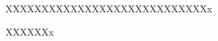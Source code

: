 \ifx\atempxetex\usewhat
\fi
{}


\titleformat{\chapter}[hang]{\xiaosan\bf\filcenter\hei\sf\boldmath}{\xiaoer\chaptertitlename}{18pt}{\xiaosan}
\titlespacing{\chapter}{0pt}{8pt}{16pt}



XXXXXXXXXXXXXXXXXXXXXXXXXXXXx

XXXXXXx

